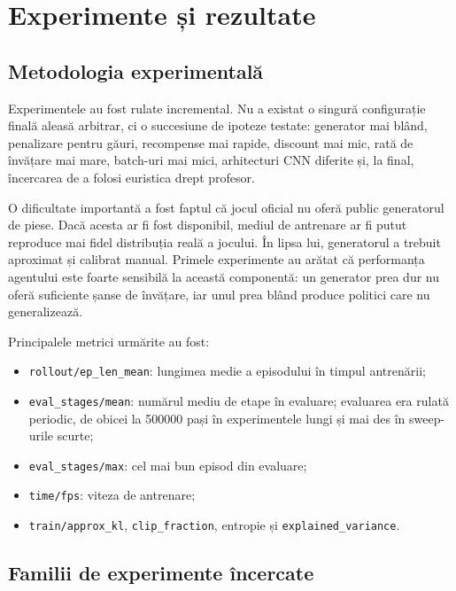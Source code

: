\documentclass[12pt,a4paper]{article}
\begin{document}
\section{Experimente și rezultate}

\subsection{Metodologia experimentală}

Experimentele au fost rulate incremental. Nu a existat o singură configurație finală aleasă arbitrar, ci o succesiune de ipoteze testate: generator mai blând, penalizare pentru găuri, recompense mai rapide, discount mai mic, rată de învățare mai mare, batch-uri mai mici, arhitecturi CNN diferite și, la final, încercarea de a folosi euristica drept profesor.

O dificultate importantă a fost faptul că jocul oficial nu oferă public generatorul de piese. Dacă acesta ar fi fost disponibil, mediul de antrenare ar fi putut reproduce mai fidel distribuția reală a jocului. În lipsa lui, generatorul a trebuit aproximat și calibrat manual. Primele experimente au arătat că performanța agentului este foarte sensibilă la această componentă: un generator prea dur nu oferă suficiente șanse de învățare, iar unul prea blând produce politici care nu generalizează.

Principalele metrici urmărite au fost:
\begin{itemize}
    \item \texttt{rollout/ep\_len\_mean}: lungimea medie a episodului în timpul antrenării;
    \item \texttt{eval\_stages/mean}: numărul mediu de etape în evaluare; evaluarea era rulată periodic, de obicei la 500000 pași în experimentele lungi și mai des în sweep-urile scurte;
    \item \texttt{eval\_stages/max}: cel mai bun episod din evaluare;
    \item \texttt{time/fps}: viteza de antrenare;
    \item \texttt{train/approx\_kl}, \texttt{clip\_fraction}, entropie și \texttt{explained\_variance}.
\end{itemize}

\subsection{Familii de experimente încercate}
\end{document}
